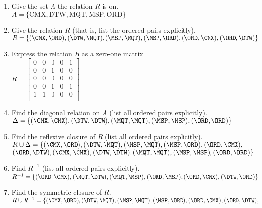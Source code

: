 \begin{questions}
    \ifprintanswers
        \vspace{-10pt}
    \fi
    \begin{EnvFullwidth}
    \begin{solution}
    \small
    \begin{enumerate}[label=(\alph*)]
    	\item Give the set $A$ the relation $R$ is on. \\
    	$A = \{ \text{CMX}, \text{DTW}, \text{MQT}, \text{MSP}, \text{ORD} \}$
    	\item Give the relation $R$ (that is, list the ordered pairs explicitly). \\
    	$R = \{ (\CMX, \ORD), (\DTW, \MQT), (\MSP, \MQT), (\MSP, \ORD), (\ORD, \CMX), (\ORD, \DTW) \}$
    	\item Express the relation $R$ as a zero-one matrix \\
    	$R = \begin{bmatrix}
    			0 & 0 & 0 & 0 & 1 \\
    			0 & 0 & 1 & 0 & 0 \\
    			0 & 0 & 0 & 0 & 0 \\
    			0 & 0 & 1 & 0 & 1 \\
    			1 & 1 & 0 & 0 & 0 \\
    			\end{bmatrix} $
    	\item Find the diagonal relation on $A$ (list all ordered pairs explicitly). \\
    	$\Delta = \{ (\CMX, \CMX), (\DTW, \DTW), (\MQT, \MQT), (\MSP, \MSP), (\ORD, \ORD) \}$
    	\item Find the reflexive closure of $R$ (list all ordered pairs explicitly). \\
    	$R \cup \Delta = \{ (\CMX, \ORD), (\DTW, \MQT), (\MSP, \MQT), (\MSP, \ORD), (\ORD, \CMX),$ \\
    	\hspace*{0.4in} $ (\ORD, \DTW), (\CMX, \CMX), (\DTW, \DTW), (\MQT, \MQT), (\MSP, \MSP), (\ORD, \ORD)  \}$
    	\item Find $R^{-1}$ (list all ordered pairs explicitly). \\
    	$R^{-1} = \{ (\ORD, \CMX), (\MQT, \DTW), (\MQT, \MSP), (\ORD, \MSP), (\ORD, \CMX), (\DTW, \ORD) \}$
    	\item Find the symmetric closure of $R$. \\
    	$R \cup R^{-1} = \{ (\CMX, \ORD), (\DTW, \MQT), (\MSP, \MQT), (\MSP, \ORD), (\ORD, \CMX), (\ORD, \DTW), $ \\

\end{enumerate}
\end{solution}
\end{EnvFullwidth}
\end{questions}
